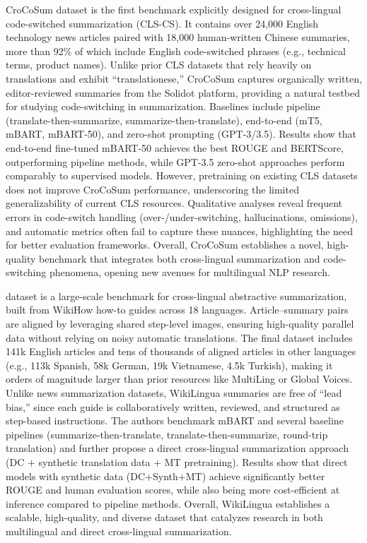 \documentclass[acmsmall]{acmart}
\begin{document}
\citep{zhang-eickhoff-2024-crocosum} CroCoSum dataset is the first benchmark explicitly designed for cross-lingual code-switched summarization (CLS-CS). It contains over 24,000 English technology news articles paired with 18,000 human-written Chinese summaries, more than 92\% of which include English code-switched phrases (e.g., technical terms, product names). Unlike prior CLS datasets that rely heavily on translations and exhibit “translationese,” CroCoSum captures organically written, editor-reviewed summaries from the Solidot platform, providing a natural testbed for studying code-switching in summarization. Baselines include pipeline (translate-then-summarize, summarize-then-translate), end-to-end (mT5, mBART, mBART-50), and zero-shot prompting (GPT-3/3.5). Results show that end-to-end fine-tuned mBART-50 achieves the best ROUGE and BERTScore, outperforming pipeline methods, while GPT-3.5 zero-shot approaches perform comparably to supervised models. However, pretraining on existing CLS datasets does not improve CroCoSum performance, underscoring the limited generalizability of current CLS resources. Qualitative analyses reveal frequent errors in code-switch handling (over-/under-switching, hallucinations, omissions), and automatic metrics often fail to capture these nuances, highlighting the need for better evaluation frameworks. Overall, CroCoSum establishes a novel, high-quality benchmark that integrates both cross-lingual summarization and code-switching phenomena, opening new avenues for multilingual NLP research.

\citep{ladhak-etal-2020-wikilingua} dataset is a large-scale benchmark for cross-lingual abstractive summarization, built from WikiHow how-to guides across 18 languages. Article–summary pairs are aligned by leveraging shared step-level images, ensuring high-quality parallel data without relying on noisy automatic translations. The final dataset includes 141k English articles and tens of thousands of aligned articles in other languages (e.g., 113k Spanish, 58k German, 19k Vietnamese, 4.5k Turkish), making it orders of magnitude larger than prior resources like MultiLing or Global Voices. Unlike news summarization datasets, WikiLingua summaries are free of “lead bias,” since each guide is collaboratively written, reviewed, and structured as step-based instructions. The authors benchmark mBART and several baseline pipelines (summarize-then-translate, translate-then-summarize, round-trip translation) and further propose a direct cross-lingual summarization approach (DC + synthetic translation data + MT pretraining). Results show that direct models with synthetic data (DC+Synth+MT) achieve significantly better ROUGE and human evaluation scores, while also being more cost-efficient at inference compared to pipeline methods. Overall, WikiLingua establishes a scalable, high-quality, and diverse dataset that catalyzes research in both multilingual and direct cross-lingual summarization.
\end{document}
